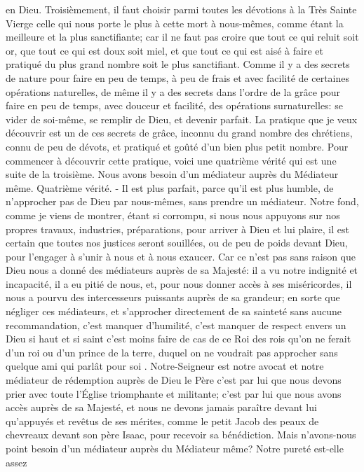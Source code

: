 en Dieu.
 Troisièmement, il faut choisir parmi toutes les dévotions à la Très Sainte Vierge celle qui nous porte le plus à
cette mort à nous-mêmes, comme étant la meilleure et la plus sanctifiante; car il ne faut pas croire que tout ce qui
reluit soit or, que tout ce qui est doux soit miel, et que tout ce qui est aisé à faire et pratiqué du plus grand nombre
soit le plus sanctifiant. Comme il y a des secrets de nature pour faire en peu de temps, à peu de frais et avec
facilité de certaines opérations naturelles, de même il y a des secrets dans l'ordre de la grâce pour faire en peu de
temps, avec douceur et facilité, des opérations surnaturelles: se vider de soi-même, se remplir de Dieu, et devenir
parfait.
La pratique que je veux découvrir est un de ces secrets de grâce, inconnu du grand nombre des chrétiens, connu
de peu de dévots, et pratiqué et goûté d'un bien plus petit nombre. Pour commencer à découvrir cette pratique,
voici une quatrième vérité qui est une suite de la troisième.
Nous avons besoin d'un médiateur auprès du Médiateur même.
 Quatrième vérité. - Il est plus parfait, parce qu'il est plus humble, de n'approcher pas de Dieu par nous-mêmes, sans prendre un médiateur. Notre fond, comme je viens de montrer, étant si corrompu, si nous nous
appuyons sur nos propres travaux, industries, préparations, pour arriver à Dieu et lui plaire, il est certain que toutes
nos justices seront souillées, ou de peu de poids devant Dieu, pour l'engager à s'unir à nous et à nous exaucer.
Car ce n'est pas sans raison que Dieu nous a donné des médiateurs auprès de sa Majesté: il a vu notre indignité
et incapacité, il a eu pitié de nous, et, pour nous donner accès à ses miséricordes, il nous a pourvu des
intercesseurs puissants auprès de sa grandeur; en sorte que négliger ces médiateurs, et s'approcher directement
de sa sainteté sans aucune recommandation, c'est manquer d'humilité, c'est manquer de respect envers un Dieu
si haut et si saint c'est moins faire de cas de ce Roi des rois qu'on ne ferait d'un roi ou d'un prince de la terre,
duquel on ne voudrait pas approcher sans quelque ami qui parlât pour soi .
 Notre-Seigneur est notre avocat et notre médiateur de rédemption auprès de Dieu le Père c'est par lui que
nous devons prier avec toute l'Église triomphante et militante; c'est par lui que nous avons accès auprès de sa
Majesté, et nous ne devons jamais paraître devant lui qu'appuyés et revêtus de ses mérites, comme le petit Jacob
des peaux de chevreaux devant son père Isaac, pour recevoir sa bénédiction.
 Mais n'avons-nous point besoin d'un médiateur auprès du Médiateur même? Notre pureté est-elle assez
